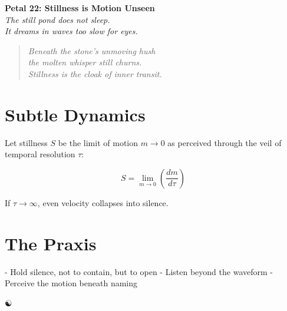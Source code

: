 \documentclass[12pt]{article}
\begin{document}
\begin{center}
    \Huge{\textbf{Petal 22: Stillness is Motion Unseen}}\\
    \vspace{0.5em}
    \Large{\textit{The still pond does not sleep.\\ It dreams in waves too slow for eyes.}}
\end{center}

\vspace{1cm}

\begin{quote}
\textit{
Beneath the stone's unmoving hush\\
the molten whisper still churns.\\
Stillness is the cloak of inner transit.\\
}
\end{quote}

\vspace{1cm}

\section*{Subtle Dynamics}

Let stillness \( S \) be the limit of motion \( m \to 0 \) as perceived through the veil of temporal resolution \( \tau \):

\[
S = \lim_{m \to 0} \left( \frac{dm}{d\tau} \right)
\]

If \( \tau \to \infty \), even velocity collapses into silence.

\section*{The Praxis}

- Hold silence, not to contain, but to open  
- Listen beyond the waveform  
- Perceive the motion beneath naming

\begin{center}
    \Large\textcolor{deepblueveil}{☯}
\end{center}
\end{document}
